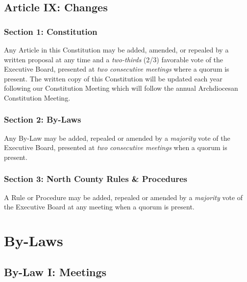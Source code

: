 \documentclass[letteraper,10pt,oneside,draft]{memoir}
\begin{document}
\section{Article IX: Changes}
\label{sec:const-9}
\subsection{Section 1: Constitution}
\label{ssec:const-9-1}
Any Article in this Constitution may be added, amended, or repealed by a written proposal at any time and a {\em two-thirds} (2/3) favorable vote of the Executive Board, presented at {\em two consecutive meetings} where a quorum is present.  The written copy of this Constitution will be updated each year following our Constitution Meeting which will follow the annual Archdiocesan Constitution Meeting.  

\subsection{Section 2: By-Laws}
\label{ssec:const-9-2}
Any By-Law may be added, repealed or amended by a {\em majority} vote of the Executive Board, presented at {\em two consecutive meetings} when a quorum is present.

\subsection{Section 3: North County Rules \& Procedures}
\label{ssec:const-9-3}
A Rule or Procedure may be added, repealed or amended by a {\em majority} vote of the Executive Board at any meeting when a quorum is present.

\chapter{By-Laws}
\label{chap:bylaw}
\section{By-Law I: Meetings}
\end{document}
